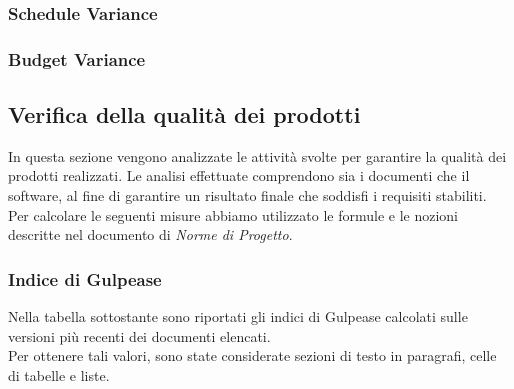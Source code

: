 \subsubsection{Schedule Variance}

\subsubsection{Budget Variance}

\subsection{Verifica della qualità dei prodotti}
In questa sezione vengono analizzate le attività svolte per garantire la qualità dei prodotti realizzati. Le analisi effettuate comprendono sia i documenti che il software, al fine di garantire un risultato finale che soddisfi i requisiti stabiliti.\\
Per calcolare le seguenti misure abbiamo utilizzato le formule e le nozioni descritte nel documento di \textit{Norme di Progetto}.

\subsubsection{Indice di Gulpease}
Nella tabella sottostante sono riportati gli indici di Gulpease calcolati sulle versioni più recenti dei documenti elencati.\\
Per ottenere tali valori, sono state considerate sezioni di testo in paragrafi, celle di tabelle e liste.




